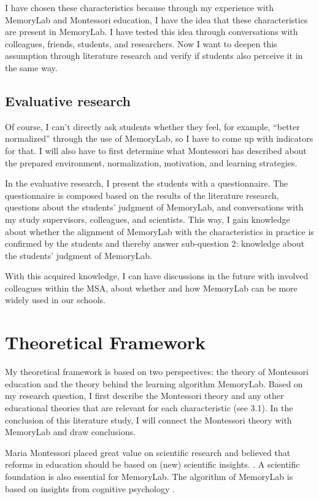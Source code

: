 \documentclass[12pt, a4paper]{article}
\begin{document}
I have chosen these characteristics because through my experience with MemoryLab and Montessori education, I have the idea that these characteristics are present in MemoryLab. I have tested this idea through conversations with colleagues, friends, students, and researchers. Now I want to deepen this assumption through literature research and verify if students also perceive it in the same way.

\subsection{Evaluative research} 

Of course, I can’t directly ask students whether they feel, for example, “better normalized” through the use of MemoryLab, so I have to come up with indicators for that. I will also have to first determine what Montessori has described about the prepared environment, normalization, motivation, and learning strategies.

In the evaluative research, I present the students with a questionnaire. The questionnaire is composed based on the results of the literature research, questions about the students’ judgment of MemoryLab, and conversations with my study supervisors, colleagues, and scientists. This way, I gain knowledge about whether the alignment of MemoryLab with the characteristics in practice is confirmed by the students and thereby answer sub-question 2: knowledge about the students’ judgment of MemoryLab.

With this acquired knowledge, I can have discussions in the future with involved colleagues within the MSA, about whether and how MemoryLab can be more widely used in our schools.

\newpage
\section{Theoretical Framework} 
My theoretical framework is based on two perspectives: the theory of Montessori education and the theory behind the learning algorithm MemoryLab. Based on my research question, I first describe the Montessori theory and any other educational theories that are relevant for each characteristic (see 3.1). In the conclusion of this literature study, I will connect the Montessori theory with MemoryLab and draw conclusions.

Maria Montessori placed great value on scientific research and believed that reforms in education should be based on (new) scientific insights. \cite[p.351]{Lillard}. A scientific foundation is also essential for MemoryLab. The algorithm of MemoryLab is based on insights from cognitive psychology \cite[]{Rijn09}.
\end{document}
